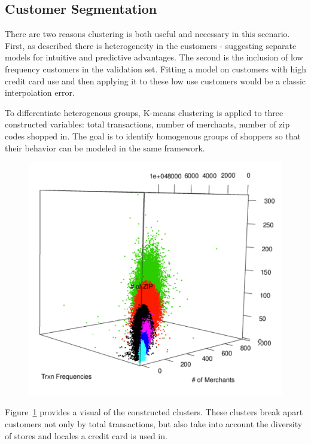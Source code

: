 \documentclass[12pt]{article} %
\begin{document}
\subsection{Customer Segmentation}
There are two reasons clustering is both useful and necessary in this scenario.  First, as described there is heterogeneity in the customers - suggesting separate models for intuitive and predictive advantages.  The second is the inclusion of low frequency customers in the validation set.  Fitting a model on customers with high credit card use and then applying it to these low use customers would be a classic interpolation error.

To differentiate heterogenous groups, K-means clustering is applied to three constructed variables: total transactions, number of merchants, number of zip codes shopped in.  The goal is to identify homogenous groups of shoppers so that their behavior can be modeled in the same framework.
\begin{figure}[h!]
\centering
\includegraphics[width=6in]{k_means.pdf}
\label{fig:cluster}
\end{figure}
Figure~\ref{fig:cluster} provides a visual of the constructed clusters.  These clusters break apart customers not only by total transactions, but also take into account the diversity of stores and locales a credit card is used in.
\end{document}
